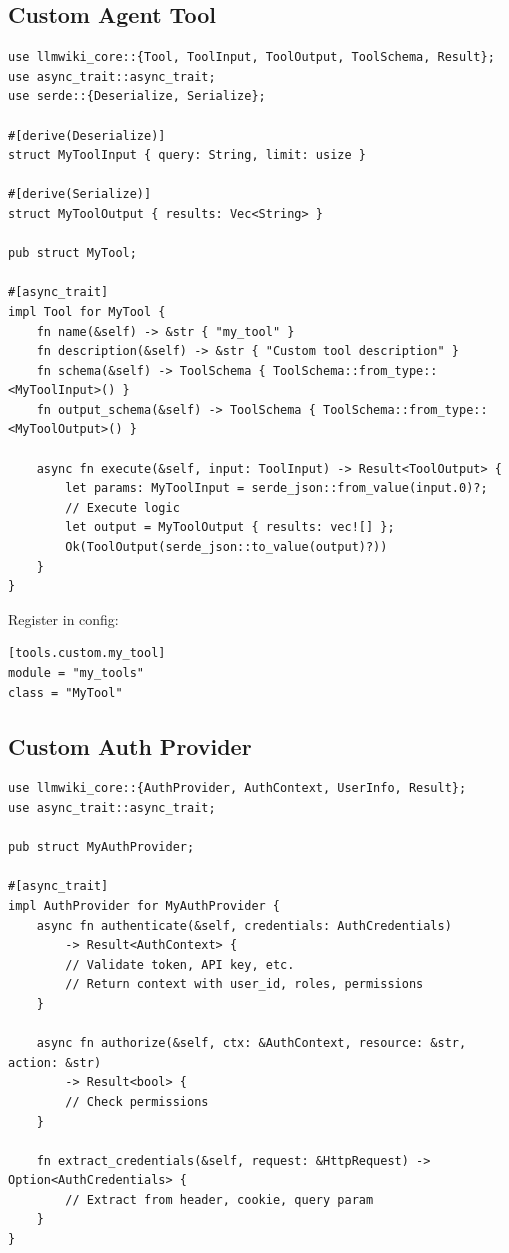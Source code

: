 \subsection{Custom Agent Tool}
\label{sec:dev:tool}

\begin{verbatim}
use llmwiki_core::{Tool, ToolInput, ToolOutput, ToolSchema, Result};
use async_trait::async_trait;
use serde::{Deserialize, Serialize};

#[derive(Deserialize)]
struct MyToolInput { query: String, limit: usize }

#[derive(Serialize)]
struct MyToolOutput { results: Vec<String> }

pub struct MyTool;

#[async_trait]
impl Tool for MyTool {
    fn name(&self) -> &str { "my_tool" }
    fn description(&self) -> &str { "Custom tool description" }
    fn schema(&self) -> ToolSchema { ToolSchema::from_type::<MyToolInput>() }
    fn output_schema(&self) -> ToolSchema { ToolSchema::from_type::<MyToolOutput>() }

    async fn execute(&self, input: ToolInput) -> Result<ToolOutput> {
        let params: MyToolInput = serde_json::from_value(input.0)?;
        // Execute logic
        let output = MyToolOutput { results: vec![] };
        Ok(ToolOutput(serde_json::to_value(output)?))
    }
}
\end{verbatim}

Register in config:
\begin{verbatim}
[tools.custom.my_tool]
module = "my_tools"
class = "MyTool"
\end{verbatim}

\subsection{Custom Auth Provider}
\label{sec:dev:auth}

\begin{verbatim}
use llmwiki_core::{AuthProvider, AuthContext, UserInfo, Result};
use async_trait::async_trait;

pub struct MyAuthProvider;

#[async_trait]
impl AuthProvider for MyAuthProvider {
    async fn authenticate(&self, credentials: AuthCredentials) 
        -> Result<AuthContext> {
        // Validate token, API key, etc.
        // Return context with user_id, roles, permissions
    }

    async fn authorize(&self, ctx: &AuthContext, resource: &str, action: &str) 
        -> Result<bool> {
        // Check permissions
    }

    fn extract_credentials(&self, request: &HttpRequest) -> Option<AuthCredentials> {
        // Extract from header, cookie, query param
    }
}
\end{verbatim}


